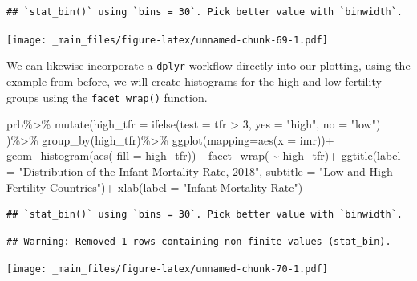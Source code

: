 \documentclass[
]{book}
\newenvironment{Shaded}{\begin{snugshade}}{\end{snugshade}}
\newcommand{\AttributeTok}[1]{\textcolor[rgb]{0.77,0.63,0.00}{#1}}
\newcommand{\DecValTok}[1]{\textcolor[rgb]{0.00,0.00,0.81}{#1}}
\newcommand{\FunctionTok}[1]{\textcolor[rgb]{0.00,0.00,0.00}{#1}}
\newcommand{\NormalTok}[1]{#1}
\newcommand{\SpecialCharTok}[1]{\textcolor[rgb]{0.00,0.00,0.00}{#1}}
\newcommand{\StringTok}[1]{\textcolor[rgb]{0.31,0.60,0.02}{#1}}
\begin{document}
\begin{verbatim}
## `stat_bin()` using `bins = 30`. Pick better value with `binwidth`.
\end{verbatim}

\texttt{[image: \_main\_files/figure-latex/unnamed-chunk-69-1.pdf]}

We can likewise incorporate a \texttt{dplyr} workflow directly into our
plotting, using the example from before, we will create histograms for
the high and low fertility groups using the \texttt{facet\_wrap()} function.

\begin{Shaded}
\begin{Highlighting}[]
\NormalTok{prb}\SpecialCharTok{\%\textgreater{}\%}
  \FunctionTok{mutate}\NormalTok{(}\AttributeTok{high\_tfr =} \FunctionTok{ifelse}\NormalTok{(}\AttributeTok{test =}\NormalTok{ tfr }\SpecialCharTok{\textgreater{}} \DecValTok{3}\NormalTok{,}
                           \AttributeTok{yes =} \StringTok{"high"}\NormalTok{,}
                           \AttributeTok{no =} \StringTok{"low"}\NormalTok{) )}\SpecialCharTok{\%\textgreater{}\%}
  \FunctionTok{group\_by}\NormalTok{(high\_tfr)}\SpecialCharTok{\%\textgreater{}\%}
  \FunctionTok{ggplot}\NormalTok{(}\AttributeTok{mapping=}\FunctionTok{aes}\NormalTok{(}\AttributeTok{x =}\NormalTok{ imr))}\SpecialCharTok{+}
  \FunctionTok{geom\_histogram}\NormalTok{(}\FunctionTok{aes}\NormalTok{( }\AttributeTok{fill =}\NormalTok{ high\_tfr))}\SpecialCharTok{+}
  \FunctionTok{facet\_wrap}\NormalTok{( }\SpecialCharTok{\textasciitilde{}}\NormalTok{ high\_tfr)}\SpecialCharTok{+}
  \FunctionTok{ggtitle}\NormalTok{(}\AttributeTok{label =} \StringTok{"Distribution of the Infant Mortality Rate, 2018"}\NormalTok{,}
          \AttributeTok{subtitle =} \StringTok{"Low and High Fertility Countries"}\NormalTok{)}\SpecialCharTok{+}
  \FunctionTok{xlab}\NormalTok{(}\AttributeTok{label =} \StringTok{"Infant Mortality Rate"}\NormalTok{)}
\end{Highlighting}
\end{Shaded}

\begin{verbatim}
## `stat_bin()` using `bins = 30`. Pick better value with `binwidth`.
\end{verbatim}

\begin{verbatim}
## Warning: Removed 1 rows containing non-finite values (stat_bin).
\end{verbatim}

\texttt{[image: \_main\_files/figure-latex/unnamed-chunk-70-1.pdf]}
\end{document}
